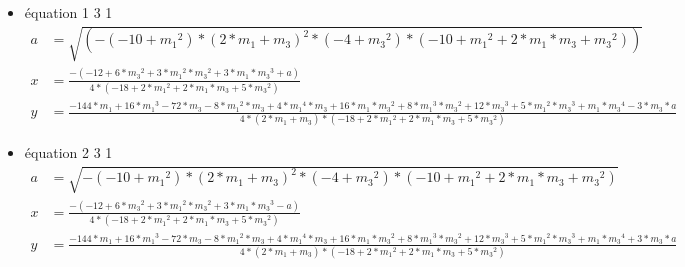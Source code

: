 \documentclass[a4paper, 8pt]{article}
\begin{document}
\begin{itemize}[label=$\bullet$]
\item équation 1 3 1
{\tiny
\begin{equation} \label{7}
   	\begin{split}
  a & = \sqrt{(-(-10+{{m}_{1}}^{2})*{(2*{m}_{1}+{m}_{3})}^{2}*(-4+{{m}_{3}}^{2})*(-10+{{m}_{1}}^{2}+2*{m}_{1}*{m}_{3}+{{m}_{3}}^{2}))}\\
  x & = \frac{-(-12+6*{{m}_{3}}^{2}+3*{{m}_{1}}^{2}*{{m}_{3}}^{2}+3*{m}_{1}*{{m}_{3}}^{3}+a)}{4*(-18+2* {{m}_{1}}^{2}+2*{m}_{1}*{m}_{3}+5*{{m}_{3}}^{2})} \\
   	 y & = \frac{-144*{m}_{1}+16*{{m}_{1}}^{3}-72*{m}_{3}-8*{{m}_{1}}^{2}*{m}_{3}+4*{{m}_{1}}^{4}*{m}_{3}+16*{m}_{1}*{{m}_{3}}^{2}+8*{{m}_{1}}^{3}*{{m}_{3}}^{2}+12*{{m}_{3}}^{3}+5*{{m}_{1}}^{2}*{{m}_{3}}^{3}+{m}_{1}*{{m}_{3}}^{4}-3*{m}_{3}*a}{4*(2*{m}_{1}+{m}_{3})*(-18+2*{{m}_{1}}^{2}+2*{m}_{1}*{m}_{3}+5*{{m}_{3}}^{2})}
   	\end{split}
\end{equation}
}
\item équation 2 3 1
{\tiny
\begin{equation} \label{8}
   	\begin{split}
	  a & = \sqrt{-(-10+{{m}_{1}}^{2})*{(2*{m}_{1}+{m}_{3})}^{2}*(-4+{{m}_{3}}^{2})*(-10+{{m}_{1}}^{2}+2*{m}_{1}*{m}_{3}+{{m}_{3}}^{2})}\\
	  x & = \frac{-(-12+6*{{m}_{3}}^{2}+3*{{m}_{1}}^{2}*{{m}_{3}}^{2}+3*{m}_{1}*{{m}_{3}}^{3}-a)}{4*(-18+2*{{m}_{1}}^{2}+2*{m}_{1}*{m}_{3}+5*{{m}_{3}}^{2})} \\
   		 y & = \frac{-144*{m}_{1}+16*{{m}_{1}}^{3}-72*{m}_{3}-8*{{m}_{1}}^{2}*{m}_{3}+4*{{m}_{1}}^{4}*{m}_{3}+16*{m}_{1}*{{m}_{3}}^{2}+8*{{m}_{1}}^{3}*{{m}_{3}}^{2}+12*{{m}_{3}}^{3}+5*{{m}_{1}}^{2}*{{m}_{3}}^{3}+{m}_{1}*{{m}_{3}}^{4}+3*{m}_{3}*a}{4*(2*{m}_{1}+{m}_{3})*(-18+2*{{m}_{1}}^{2}+2*{m}_{1}*{m}_{3}+5*{{m}_{3}}^{2})}
   	\end{split}
\end{equation}
}
\end{itemize}



\nocite{DBLP:conf/icassp/MerweW01}
\nocite{DBLP:journals/ipl/BoroujerdiU98}
\end{document}
